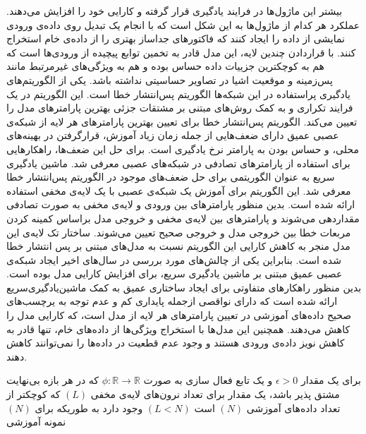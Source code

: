 

بیشتر این  ماژول‌ها در فرایند یادگیری قرار گرفته و کارایی خود را افزایش می‌دهند. عملکرد هر کدام از ماژول‌ها به این شکل است که با انجام یک تبدیل روی داده‌ی ورودی نمایشی از داده را ایجاد کنند که فاکتورهای جداساز بهتری را از داده‌ی خام استخراج کنند. با قراردادن چندین لایه، این مدل قادر به تخمین توابع پیچیده از ورودی‌ها است که هم به کوچکترین جزییات داده حساس بوده و هم به ویژگی‌های غیرمرتبط مانند پس‌زمینه و موقعیت اشیا در تصاویر حساسیتی نداشته باشد. 
یکی از  الگوریتم‌های یادگیری پراستفاده در این شبکه‌ها الگوریتم پس‌انتشار خطا است. این الگوریتم در یک فرایند تکراری و به کمک  روش‌های مبتنی بر مشتقات جزئی بهترین پارامترهای مدل را تعیین می‌کند. الگوریتم پس‌انتشار خطا برای تعیین بهترین پارامترهای هر لایه از شبکه‌ی عصبی عمیق دارای ضعف‌هایی از جمله زمان زیاد آموزش، قرارگرفتن در بهینه‌های محلی، و حساس بودن به پارامتر نرخ یادگیری است. برای حل این ضعف‌ها، راهکارهایی برای استفاده از پارامترهای تصادفی در شبکه‌های عصبی معرفی شد. ماشین یادگیری سریع به عنوان الگوریتمی برای  حل ضعف‌های موجود در الگوریتم پس‌انتشار خطا معرفی شد. این الگوریتم برای آموزش یک شبکه‌ی عصبی با یک لایه‌ی مخفی استفاده ارائه شده است. بدین منظور پارامترهای بین ورودی و لایه‌ی مخفی به صورت تصادفی مقداردهی می‌شوند و پارامترهای بین لایه‌ی مخفی و خروجی مدل براساس کمینه کردن مربعات خطا بین خروجی مدل و خروجی صحیح تعیین می‌شوند.
ساختار تک ‌لایه‌ی این مدل منجر به کاهش کارایی این الگوریتم نسبت به مدل‌های مبتنی بر پس انتشار خطا شده است. بنابراین یکی از چالش‌های مورد بررسی در سال‌های اخیر ایجاد شبکه‌ی عصبی عمیق مبتنی بر ماشین یادگیری سریع، برای افزایش کارایی مدل بوده است. بدین منظور راهکارهای متفاوتی برای ایجاد ساختاری عمیق به کمک ماشین‌یادگیری‌سریع ارائه شده است که دارای نواقصی ازجمله پایداری کم و عدم توجه به یرچسب‌های صحیح داده‌های آموزشی در تعیین پارامترهای هر لایه از مدل است، که کارایی مدل را کاهش می‌دهند. همچنین این مدل‌ها با استخراج ویژگی‌ها از داده‌های خام، تنها قادر به کاهش نویز داده‌ی ورودی هستند و وجود عدم قطعیت در داده‌ها را نمی‌توانند کاهش دهند.


\begin{theorem}
	برای یک مقدار 
	$\epsilon>0$
	و یک تابع فعال سازی  به صورت 
	$\phi : \mathbb{R}\rightarrow \mathbb{R}$
	که در هر بازه بی‌نهایت مشتق پذیر باشد، یک مقدار برای تعداد نرون‌های لایه‌ی مخفی 
	$(L)$
	که کوچکتر از تعداد داده‌های آموزشی 
	$(N)$
	است 
	$(L<N)$
	وجود دارد به طوریکه برای $(N)$ نمونه آموزشی 
\end{theorem}



